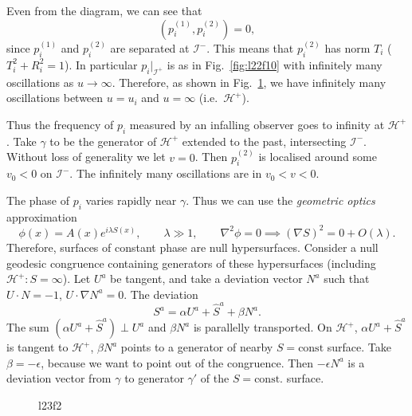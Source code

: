 
Even from the diagram, we can see that 
\begin{equation}
  (p_i^{(1)}, p_i^{(2)}) = 0,
\end{equation}
since $p_i^{(1)}$ and $p_{i}^{(2)}$ are separated at $\mathscr{I}^-$.
This means that $p_i^{(2)}$ has norm $T_i$ ($T_i^2 + R_i^2 = 1$).
In particular $p_i \vert_{\mathscr{I}^+}$ is as in Fig.~\ref{fig:l22f10} with infinitely many oscillations as $u \to \infty$.
Therefore, as shown in Fig.~\ref{fig:l23f1}, we have infinitely many oscillations between $u = u_i$ and $u = \infty$ (i.e.~$\mathcal{H}^+$).
\begin{figure}[tbhp]
  \centering
  \def\svgwidth{0.4\columnwidth}
  
  \caption{}
  \label{fig:l23f1}
\end{figure}
Thus the frequency of $p_i$ measured by an infalling observer goes to infinity at $\mathcal{H}^+$.
Take $\gamma$ to be the generator of $\mathcal{H}^+$ extended to the past, intersecting $\mathscr{I}^-$. Without loss of generality we let $v =0$.
Then $p_i^{(2)}$ is localised around some $v_0 < 0$ on $\mathscr{I}^-$. The infinitely many oscillations are in $v_0 < v < 0$.

The phase of $p_i$ varies rapidly near $\gamma$. Thus we can use the \emph{geometric optics} approximation
\begin{equation}
  \phi(x) = A(x) e^{i \lambda S(x)}, \qquad \lambda \gg 1, \qquad \nabla^2 \phi = 0 \implies (\nabla S)^2 = 0 + O(\lambda).
\end{equation}
Therefore, surfaces of constant phase are null hypersurfaces.
Consider a null geodesic congruence containing generators of these hypersurfaces (including $\mathcal{H}^+ \colon S = \infty$).
Let $U^{a}$ be tangent, and take a deviation vector $N^{a}$ such that $U \cdot N = -1$, $U \cdot \nabla N^{a} = 0$.
The deviation 
\begin{equation}
  S^{a} = \alpha U^{a} + \hat{S}^{a} + \beta N^{a}.
\end{equation}
The sum $(\alpha U^{a} + \hat{S}^{a}) \perp U^{a}$ and $\beta N^{a}$ is parallelly transported.
On $\mathcal{H}^+$, $\alpha U^{a} + \hat{S}^{a}$ is tangent to $\mathcal{H}^+$, $\beta N^{a}$ points to a generator of nearby $S = \text{const}$ surface.
Take $\beta = -\epsilon$, because we want to point out of the congruence.
Then $- \epsilon N^{a}$ is a deviation vector from $\gamma$ to generator $\gamma'$ of the $S=\text{const.}$ surface.
\begin{figure}[tbhp]
  \centering
  \caption{l23f2}
  \label{fig:l23f2}
\end{figure}

